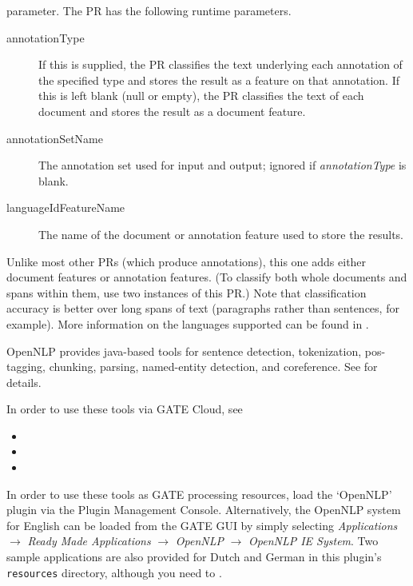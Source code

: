 parameter.  The PR has the following runtime parameters.
\begin{description}
\item[annotationType] If this is supplied, the PR classifies the text underlying
  each annotation of the specified type and stores the result as a feature on
  that annotation.  If this is left blank (null or empty), the PR classifies the
  text of each document and stores the result as a document feature.
\item[annotationSetName] The annotation set used for input and output; ignored
  if \emph{annotationType} is blank.
\item[languageIdFeatureName] The name of the document or annotation feature used
  to store the results.
\end{description}


Unlike most other PRs (which produce annotations), this one adds either document
features or annotation features.  (To classify both whole documents and spans
within them, use two instances of this PR.)  Note that classification accuracy
is better over long spans of text (paragraphs rather than sentences, for
example).  More information on the languages supported can be found in
.

OpenNLP provides java-based tools for sentence detection, tokenization,
pos-tagging, chunking, parsing, named-entity detection, and coreference. See
 for details.

In order to use these tools via GATE Cloud, see

\begin{itemize}
    \item {}
    \item {}
    \item {}
\end{itemize}

In order to use these tools as GATE processing resources, load the `OpenNLP'
plugin via the Plugin Management Console. Alternatively, the OpenNLP system for
English can be loaded from the GATE GUI by simply selecting \emph{Applications}
$\rightarrow$ \emph{Ready Made Applications} $\rightarrow$ \emph{OpenNLP}
$\rightarrow$ \emph{OpenNLP IE System}.  Two sample applications are also
provided for Dutch and German in this plugin's \texttt{resources} directory,
although you need to .


